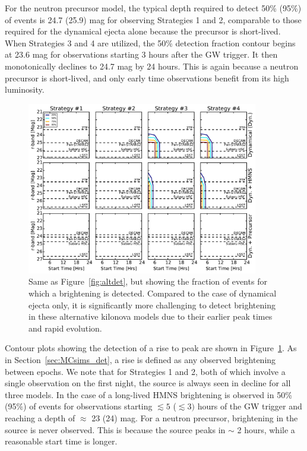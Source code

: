 For the neutron precursor model, the typical depth required to detect 50\% (95\%) of events is 24.7 (25.9) mag for observing Strategies 1 and 2, comparable to those required for the dynamical ejecta alone because the precursor is short-lived. When Strategies 3 and 4 are utilized, the 50\% detection fraction contour begins at 23.6 mag for observations starting 3 hours after the GW trigger. It then monotonically declines to 24.7 mag by 24 hours. This is again because a neutron precursor is short-lived, and only early time observations benefit from its high luminosity.

\begin{figure}[t!]
\centering
\includegraphics[width=0.9\textwidth]{./figs/chapter2/ch2_f20.pdf}
\caption{Same as Figure~\ref{fig:altdet}, but showing the fraction of events for which a brightening is detected. Compared to the case of dynamical ejecta only, it is significantly more challenging to detect brightening in these alternative kilonova models due to their earlier peak times and rapid evolution.}
\label{fig:altrise}
\end{figure}
   
Contour plots showing the detection of a rise to peak are shown in Figure~\ref{fig:altrise}. As in Section~\ref{sec:MCsims_det}, a rise is defined as any observed brightening between epochs. We note that for Strategies 1 and 2, both of which involve a single observation on the first night, the source is always seen in decline for all three models. In the case of a long-lived HMNS brightening is observed in 50\% (95\%) of events for observations starting $\lesssim5$ ($\lesssim 3)$ hours of the GW trigger and reaching a depth of $\approx$ 23 (24) mag. For a neutron precursor, brightening in the source is never observed. This is because the source peaks in $\sim$ 2 hours, while a reasonable start time is longer.
 
